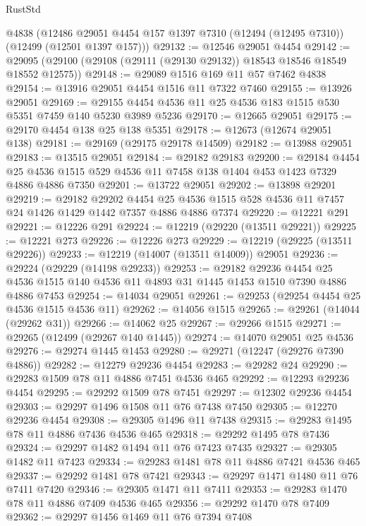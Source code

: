\begin{lexlean}{RustStd}
\begin{coremodule}
{\begin{coremodule}
{{{{{{{{{{{{{{{{{{{{{{{{{{{{{{{{{{{{{{{{{{{{{{{{{{{{{{{{{{{{{{{{{{{{{{{{{{{{{{{{    @4838
    (@12486 @29051 @4454 @157 @1397 @7310 (@12494 (@12495 @7310)) (@12499 (@12501 @1397 @157)))
@29132 := @12546 @29051 @4454
@29142 := @29095 (@29100 (@29108 (@29111 (@29130 @29132)) @18543 @18546 @18549 @18552 @12575))
@29148 := @29089 @1516 @169 @11 @57 @7462 @4838
@29154 := @13916 @29051 @4454 @1516 @11 @7322 @7460
@29155 := @13926 @29051
@29169 := @29155 @4454 @4536 @11 @25 @4536 @183 @1515 @530 @5351 @7459 @140 @5230 @3989 @5236
@29170 := @12665 @29051
@29175 := @29170 @4454 @138 @25 @138 @5351
@29178 := @12673 (@12674 @29051 @138)
@29181 := @29169 (@29175 @29178 @14509)
@29182 := @13988 @29051
@29183 := @13515 @29051
@29184 := @29182 @29183
@29200 := @29184
    @4454
    @25
    @4536
    @1515
    @529
    @4536
    @11
    @7458
    @138
    @1404
    @453
    @1423
    @7329
    @4886
    @4886
    @7350
@29201 := @13722 @29051
@29202 := @13898 @29201
@29219 := @29182
    @29202
    @4454
    @25
    @4536
    @1515
    @528
    @4536
    @11
    @7457
    @24
    @1426
    @1429
    @1442
    @7357
    @4886
    @4886
    @7374
@29220 := @12221 @291
@29221 := @12226 @291
@29224 := @12219 (@29220 (@13511 @29221))
@29225 := @12221 @273
@29226 := @12226 @273
@29229 := @12219 (@29225 (@13511 @29226))
@29233 := @12219 (@14007 (@13511 @14009)) @29051
@29236 := @29224 (@29229 (@14198 @29233))
@29253 := @29182
    @29236
    @4454
    @25
    @4536
    @1515
    @140
    @4536
    @11
    @4893
    @31
    @1445
    @1453
    @1510
    @7390
    @4886
    @4886
    @7453
@29254 := @14034 @29051
@29261 := @29253 (@29254 @4454 @25 @4536 @1515 @4536 @11)
@29262 := @14056 @1515
@29265 := @29261 (@14044 (@29262 @31))
@29266 := @14062 @25
@29267 := @29266 @1515
@29271 := @29265 (@12499 (@29267 @140 @1445))
@29274 := @14070 @29051 @25 @4536
@29276 := @29274 @1445 @1453
@29280 := @29271 (@12247 (@29276 @7390 @4886))
@29282 := @12279 @29236 @4454
@29283 := @29282 @24
@29290 := @29283 @1509 @78 @11 @4886 @7451 @4536 @465
@29292 := @12293 @29236 @4454
@29295 := @29292 @1509 @78 @7451
@29297 := @12302 @29236 @4454
@29303 := @29297 @1496 @1508 @11 @76 @7438 @7450
@29305 := @12270 @29236 @4454
@29308 := @29305 @1496 @11 @7438
@29315 := @29283 @1495 @78 @11 @4886 @7436 @4536 @465
@29318 := @29292 @1495 @78 @7436
@29324 := @29297 @1482 @1494 @11 @76 @7423 @7435
@29327 := @29305 @1482 @11 @7423
@29334 := @29283 @1481 @78 @11 @4886 @7421 @4536 @465
@29337 := @29292 @1481 @78 @7421
@29343 := @29297 @1471 @1480 @11 @76 @7411 @7420
@29346 := @29305 @1471 @11 @7411
@29353 := @29283 @1470 @78 @11 @4886 @7409 @4536 @465
@29356 := @29292 @1470 @78 @7409
@29362 := @29297 @1456 @1469 @11 @76 @7394 @7408
}}}}}}}}}}}}}}}}}}}}}}}}}}}}}}}}}}}}}}}}}}}}}}}}}}}}}}}}}}}}}}}}}}}}}}}}}}}}}}}}
\end{coremodule}}
\end{coremodule}
\end{lexlean}
